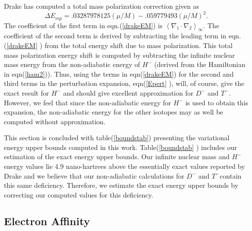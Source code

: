\documentclass[12pt,thmsa]{article}
\begin{document}
Drake\cite{Drake88} has computed a total mass polarization correction given
as 
\begin{equation}
\Delta E_{mp}=.03287978125\left( \mu /M\right) -.059779493\left( \mu
/M\right) ^2.  \label{drakeEM}
\end{equation}
The coefficient of the first term in eqn.(\ref{drakeEM}) is $\left\langle
\nabla _1\cdot \nabla _2\right\rangle _\infty $. The coefficient of the
second term is derived by subtracting the leading term in eqn.(\ref{drakeEM}%
) from the total energy shift due to mass polarization. This total mass
polarization energy shift is computed by subtracting the infinite nuclear
mass energy from the non-adiabatic energy of $H^{-}$ (derived from the
Hamiltonian in eqn(\ref{ham2})). Thus, using the terms in eqn(\ref{drakeEM})
for the second and third terms in the perturbation expansion, eqn(\ref{Epert}%
), will, of course, give the exact result for $H^{-}$ and should give
excellent approximation for $D^{-}$ and $T^{-}$. However, we feel that since
the non-adiabatic energy for $H^{-}$ is used to obtain this expansion, the
non-adiabatic energy for the other isotopes may as well be computed without
approximation.

This section is concluded with table(\ref{boundstab}) presenting the
variational energy upper bounds computed in this work. Table(\ref{boundstab}%
) includes our estimation of the exact energy upper bounds. Our infinite
nuclear mass and $H^{-}$ energy values lie 4.9 nano-hartrees above the
essentially exact values reported by Drake\cite{Drake88} and we believe that
our non-adiabatic calculations for $D^{-}$ and $T^{-}$contain this same
deficiency. Therefore, we estimate the exact energy upper bounds by
correcting our computed values for this deficiency.

\subsection{Electron Affinity}
\end{document}
